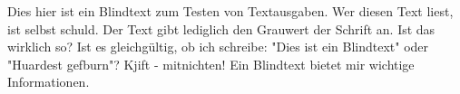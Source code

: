 %
\null\vfil
\begin{otherlanguage}{ngerman}
\begin{center}\textsf{\textbf{\abstractname}}\end{center}

\noindent Dies hier ist ein Blindtext zum Testen von Textausgaben. Wer diesen Text liest,
ist selbst schuld. Der Text gibt lediglich den Grauwert der Schrift an.
Ist das wirklich so? Ist es gleichgültig, ob ich schreibe: "Dies ist ein Blindtext"
oder "Huardest gefburn"? Kjift - mitnichten! Ein Blindtext bietet mir wichtige Informationen.

\end{otherlanguage}
\vfil\null
